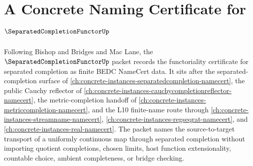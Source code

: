 \chapter{A Concrete Naming Certificate for $\SeparatedCompletionFunctorUp$}
\label{ch:concrete-instances-separated-completion-functor-namecert}

Following Bishop and Bridges and Mac Lane, the $\SeparatedCompletionFunctorUp$ packet records the functoriality certificate for separated completion as finite BEDC NameCert data. It sits after the separated-completion surface of \autoref{ch:concrete-instances-separatedcompletion-namecert}, the public Cauchy reflector of \autoref{ch:concrete-instances-cauchycompletionreflector-namecert}, the metric-completion handoff of \autoref{ch:concrete-instances-metriccompletion-namecert}, and the L10 finite-name route through \autoref{ch:concrete-instances-streamname-namecert}, \autoref{ch:concrete-instances-regseqrat-namecert}, and \autoref{ch:concrete-instances-real-namecert}. The packet names the source-to-target transport of a uniformly continuous map through separated completion without importing quotient completions, chosen limits, host function extensionality, countable choice, ambient completeness, or bridge checking.


